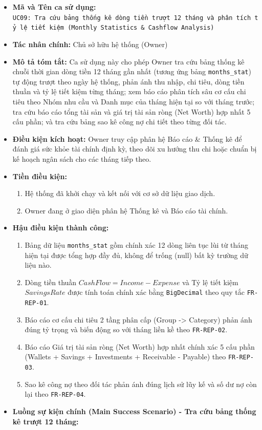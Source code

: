 \documentclass[11pt,a4paper]{article}
\providecommand{\tightlist}{
  \setlength{\itemsep}{0pt}\setlength{\parskip}{0pt}}
\begin{document}
\begin{itemize}
\tightlist
\item
  \textbf{Mã và Tên ca sử dụng:}
  \texttt{UC09:\ Tra\ cứu\ bảng\ thống\ kê\ dòng\ tiền\ trượt\ 12\ tháng\ và\ phân\ tích\ tỷ\ lệ\ tiết\ kiệm\ (Monthly\ Statistics\ \&\ Cashflow\ Analysis)}
\item
  \textbf{Tác nhân chính:} Chủ sở hữu hệ thống (Owner)
\item
  \textbf{Mô tả tóm tắt:} Ca sử dụng này cho phép Owner tra cứu bảng
  thống kê chuỗi thời gian dòng tiền 12 tháng gần nhất (tương ứng bảng
  \texttt{months\_stat}) tự động trượt theo ngày hệ thống, phản ánh thu
  nhập, chi tiêu, dòng tiền thuần và tỷ lệ tiết kiệm từng tháng; xem báo
  cáo phân tích sâu cơ cấu chi tiêu theo Nhóm nhu cầu và Danh mục của
  tháng hiện tại so với tháng trước; tra cứu báo cáo tổng tài sản và giá
  trị tài sản ròng (Net Worth) hợp nhất 5 cấu phần; và tra cứu bảng sao
  kê công nợ chi tiết theo từng đối tác.
\item
  \textbf{Điều kiện kích hoạt:} Owner truy cập phân hệ Báo cáo \& Thống
  kê để đánh giá sức khỏe tài chính định kỳ, theo dõi xu hướng thu chi
  hoặc chuẩn bị kế hoạch ngân sách cho các tháng tiếp theo.
\item
  \textbf{Tiền điều kiện:}

  \begin{enumerate}
  \def\labelenumi{\arabic{enumi}.}
  \tightlist
  \item
    Hệ thống đã khởi chạy và kết nối với cơ sở dữ liệu giao dịch.
  \item
    Owner đang ở giao diện phân hệ Thống kê và Báo cáo tài chính.
  \end{enumerate}
\item
  \textbf{Hậu điều kiện thành công:}

  \begin{enumerate}
  \def\labelenumi{\arabic{enumi}.}
  \tightlist
  \item
    Bảng dữ liệu \texttt{months\_stat} gồm chính xác 12 dòng liên tục
    lùi từ tháng hiện tại được tổng hợp đầy đủ, không để trống (null)
    bất kỳ trường dữ liệu nào.
  \item
    Dòng tiền thuần \(CashFlow = Income - Expense\) và Tỷ lệ tiết kiệm
    \(SavingsRate\) được tính toán chính xác bằng \texttt{BigDecimal}
    theo quy tắc \texttt{FR-REP-01}.
  \item
    Báo cáo cơ cấu chi tiêu 2 tầng phân cấp (Group -\textgreater{}
    Category) phản ánh đúng tỷ trọng và biến động so với tháng liền kề
    theo \texttt{FR-REP-02}.
  \item
    Báo cáo Giá trị tài sản ròng (Net Worth) hợp nhất chính xác 5 cấu
    phần (Wallets + Savings + Investments + Receivable - Payable) theo
    \texttt{FR-REP-03}.
  \item
    Sao kê công nợ theo đối tác phản ánh đúng lịch sử lũy kế và số dư nợ
    còn lại theo \texttt{FR-REP-04}.
  \end{enumerate}
\item
  \textbf{Luồng sự kiện chính (Main Success Scenario) - Tra cứu bảng
  thống kê trượt 12 tháng:}


\end{itemize}
\end{document}

